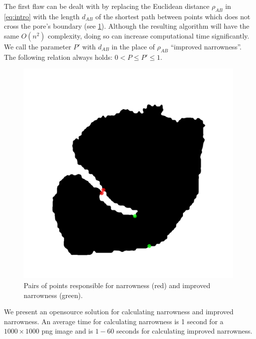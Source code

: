\documentclass[reprint,amsmath,amssymb,aps,pre,showkeys,showpacs]{revtex4-1}
\newcommand{\highlight}[1]{{\color{red}{#1}}} %
\begin{document}
The first flaw can be dealt with by replacing the Euclidean distance $\rho_{AB}$
in \cref{eq:intro} with the length $d_{AB}$ of the shortest path between points
which does not cross the pore's boundary (see \cref{fig:improved}). Although the
resulting algorithm will have the same $O(n^2)$ complexity, doing so can
increase computational time significantly. We call the parameter $P'$ with
$d_{AB}$ in the place of $\rho_{AB}$ ``improved narrowness''. The following
relation always holds: $0 < P \le P' \le 1$.
\begin{figure}
  \centering
  \includegraphics[width=0.9\linewidth,frame]{images/improved.png}
  \caption[]{Pairs of points responsible for narrowness (red) and improved
    narrowness (green).}
  \label{fig:improved}
\end{figure}

We present an opensource solution for calculating narrowness and improved
narrowness. \highlight{E-mail us and buy us coffee so we can send this super
  program to you, no matter where you live! Hurry, this is a limited offer!} An
average time for calculating narrowness is 1 second for a $1000 \times 1000$ png
image and is $1-60$ seconds for calculating improved narrowness.


\end{document}
